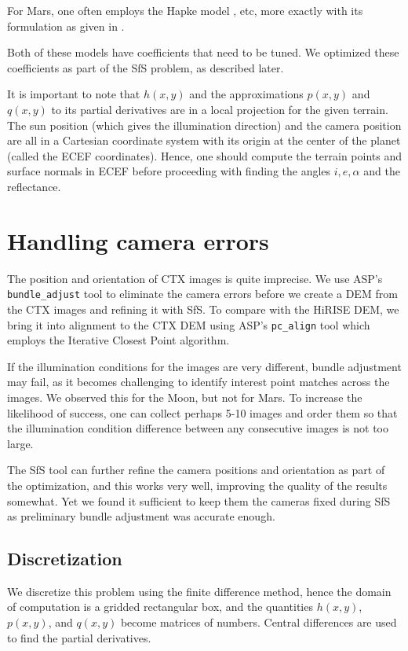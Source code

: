 \documentclass[draft,linenumbers]{agujournal}
\begin{document}
For Mars, one often employs the Hapke model \citet{hapke1993opposition}, etc, more exactly with its formulation as given in \citep{fernando2013surface}. 

Both of these models have coefficients that need to be tuned. We optimized these coefficients as part of the SfS problem, as described later. 

It is important to note that $h(x, y)$ and the approximations $p(x, y)$ and $q(x,y)$ to its partial
derivatives are in a local projection for the given terrain. The sun position (which gives the 
illumination direction) and the camera position are all in a Cartesian coordinate system with its origin at the center of the planet (called the ECEF coordinates). Hence, one should compute the terrain points and surface normals in ECEF before proceeding with finding the angles $i, e, \alpha$ and the reflectance.  
\section{Handling camera errors}
\label{bundleadjust}

The position and orientation of CTX images is quite imprecise. We use ASP's \texttt{bundle\_adjust} tool
to eliminate the camera errors before we create a DEM from the CTX images and refining it with SfS. To compare with the HiRISE DEM, we bring it into alignment to the CTX DEM using ASP's \texttt{pc\_align} tool which employs the Iterative Closest Point algorithm. 

If the illumination conditions for the images are very different, bundle adjustment may fail, as it becomes challenging to identify interest point matches across the images. We observed this for the Moon, but not for Mars. To increase the likelihood of success, one can collect perhaps 5-10 images and order them so that the illumination condition difference between any consecutive images is not too large.   

The SfS tool can further refine the camera positions and orientation as part of the optimization, and this works very well, improving the quality of the results somewhat. Yet we found it sufficient to keep them the cameras fixed during SfS as preliminary bundle adjustment was accurate enough. 

\subsection{Discretization}

We discretize this problem using the finite difference method, hence the
domain of computation is a gridded rectangular box, and the quantities $h(x,y)$, $p(x,y)$, and $q(x, y)$
become matrices of numbers. Central differences are used to find
the partial derivatives.
\end{document}
